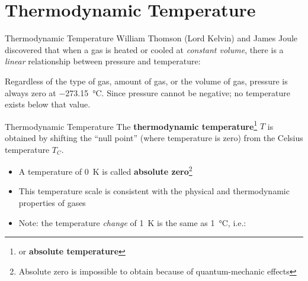 \documentclass[12pt,aspectratio=169]{beamer}
\newcommand{\eq}[2]{
  \vspace{#1}{\Large
    \begin{displaymath}
      #2
    \end{displaymath}
  }
}
\begin{document}
\section{Thermodynamic Temperature}

\begin{frame}{Thermodynamic Temperature}
  William Thomson (Lord Kelvin) and James Joule discovered that when a gas is
  heated or cooled at \emph{constant volume}, there is a \emph{linear}
  relationship between pressure and temperature:
  \begin{center}
  \end{center}
  Regardless of the type of gas, amount of gas, or the volume of gas, pressure
  is always zero at \SI{-273.15}{\celsius}. Since pressure cannot be negative;
  no temperature exists below that value.
\end{frame}



\begin{frame}{Thermodynamic Temperature}
  The \textbf{thermodynamic temperature}\footnote{or \textbf{absolute
      temperature}} $T$
  is obtained by shifting the ``null point'' (where temperature is zero) from
  the Celsius temperature $T_C$.
  
  \eq{-.2in}{
    \boxed{T = T_C + 273.15}
  }
  \begin{itemize}
  \item\vspace{-.1in}A temperature of \SI{0}{\kelvin} is called
    \textbf{absolute zero}\footnote{Absolute zero is impossible to obtain
      because of quantum-mechanic effects}
  \item This temperature scale is consistent with the physical and
    thermodynamic properties of gases
  \item Note: the temperature \emph{change} of \SI{1}{\kelvin} is the same as
    \SI{1}{\celsius}, i.e.:

    \eq{-.25in}{
      \Delta T=\Delta T_C
    }
  \end{itemize}
  \vspace{.25in}
\end{frame}
  
\end{document}
